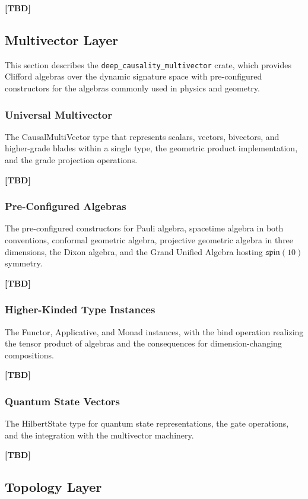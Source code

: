 \textbf{[TBD]}
 
 
\subsection{Multivector Layer}
\label{sec:implementation_multivector}
 
This section describes the \texttt{deep\_causality\_multivector} crate, which provides Clifford algebras over the dynamic signature space with pre-configured constructors for the algebras commonly used in physics and geometry.
 
\subsubsection{Universal Multivector}
The CausalMultiVector type that represents scalars, vectors, bivectors, and higher-grade blades within a single type, the geometric product implementation, and the grade projection operations.
 
\textbf{[TBD]}
 
\subsubsection{Pre-Configured Algebras}
The pre-configured constructors for Pauli algebra, spacetime algebra in both conventions, conformal geometric algebra, projective geometric algebra in three dimensions, the Dixon algebra, and the Grand Unified Algebra hosting $\mathfrak{spin}(10)$ symmetry.
 
\textbf{[TBD]}
 
\subsubsection{Higher-Kinded Type Instances}
The Functor, Applicative, and Monad instances, with the bind operation realizing the tensor product of algebras and the consequences for dimension-changing compositions.
 
\textbf{[TBD]}
 
\subsubsection{Quantum State Vectors}
The HilbertState type for quantum state representations, the gate operations, and the integration with the multivector machinery.
 
\textbf{[TBD]}
 
 
\subsection{Topology Layer}
\label{sec:implementation_topology}
 
